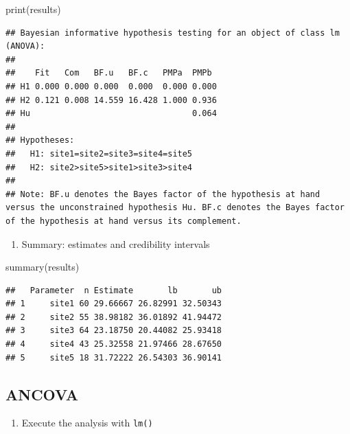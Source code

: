 \documentclass[
]{book}
\newenvironment{Shaded}{\begin{snugshade}}{\end{snugshade}}
\newcommand{\FunctionTok}[1]{\textcolor[rgb]{0.00,0.00,0.00}{#1}}
\newcommand{\NormalTok}[1]{#1}
\providecommand{\tightlist}{%
  \setlength{\itemsep}{0pt}\setlength{\parskip}{0pt}}
\begin{document}
\begin{Shaded}
\begin{Highlighting}[]
\FunctionTok{print}\NormalTok{(results)}
\end{Highlighting}
\end{Shaded}

\begin{verbatim}
## Bayesian informative hypothesis testing for an object of class lm (ANOVA):
## 
##    Fit   Com   BF.u   BF.c   PMPa  PMPb 
## H1 0.000 0.000 0.000  0.000  0.000 0.000
## H2 0.121 0.008 14.559 16.428 1.000 0.936
## Hu                                 0.064
## 
## Hypotheses:
##   H1: site1=site2=site3=site4=site5
##   H2: site2>site5>site1>site3>site4
## 
## Note: BF.u denotes the Bayes factor of the hypothesis at hand versus the unconstrained hypothesis Hu. BF.c denotes the Bayes factor of the hypothesis at hand versus its complement.
\end{verbatim}

\begin{enumerate}
\def\labelenumi{\arabic{enumi})}
\setcounter{enumi}{4}
\tightlist
\item
  Summary: estimates and credibility intervals
\end{enumerate}

\begin{Shaded}
\begin{Highlighting}[]
\FunctionTok{summary}\NormalTok{(results)}
\end{Highlighting}
\end{Shaded}

\begin{verbatim}
##   Parameter  n Estimate       lb       ub
## 1     site1 60 29.66667 26.82991 32.50343
## 2     site2 55 38.98182 36.01892 41.94472
## 3     site3 64 23.18750 20.44082 25.93418
## 4     site4 43 25.32558 21.97466 28.67650
## 5     site5 18 31.72222 26.54303 36.90141
\end{verbatim}

\hypertarget{ancova}{%
\subsection{ANCOVA}\label{ancova}}

\begin{enumerate}
\def\labelenumi{\arabic{enumi})}
\tightlist
\item
  Execute the analysis with \texttt{lm()}
\end{enumerate}
\end{document}
